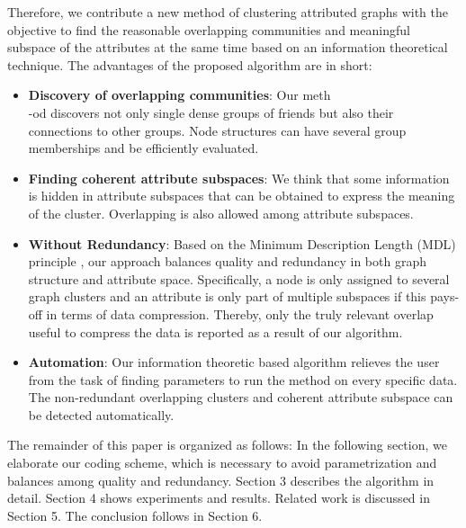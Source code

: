 
Therefore, we contribute a new method of clustering attributed graphs with the objective to find the reasonable overlapping communities and meaningful subspace of the attributes at the same time based on an information theoretical technique. The advantages of the proposed algorithm are in short:

\begin{itemize}
\item  \textbf{Discovery of overlapping communities}:
Our meth\\-od discovers not only single dense groups of friends but also their connections to other groups. Node structures can have several group memberships and be efficiently evaluated.
\item  \textbf{Finding coherent attribute subspaces}:
We think that some information is hidden in attribute subspaces that can be obtained to express the meaning of the cluster. Overlapping is also allowed among attribute subspaces.  
\item  \textbf{Without Redundancy}: 
Based on the Minimum Description Length (MDL) principle \cite{mdlbook}, our approach balances quality and redundancy in both graph structure and attribute space. Specifically, a node is only assigned to several graph clusters and an attribute is only part of multiple subspaces if this pays-off in terms of data compression. Thereby, only the truly relevant overlap useful to compress the data is reported as a result of our algorithm.
\item  \textbf{Automation}:
Our information theoretic based algorithm relieves the user from the task of finding parameters to run the method on every specific data. The non-redundant overlapping clusters and coherent attribute subspace can be detected automatically.  
\end{itemize}

The remainder of this paper is organized as follows: In the following section, we elaborate our coding scheme, which is necessary to avoid parametrization and balances among quality and redundancy. Section 3 describes the algorithm in detail. Section 4 shows experiments and results. Related work is discussed in Section 5. The conclusion follows in Section 6.

